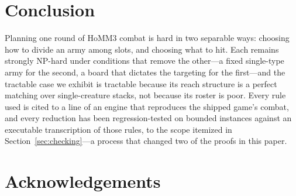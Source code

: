 \documentclass[11pt,a4paper]{article}
\theoremstyle{plain}
\theoremstyle{definition}
\theoremstyle{plain}
\theoremstyle{definition}
\theoremstyle{remark}
\begin{document}
\section{Conclusion}\label{sec:conclusion}

Planning one round of HoMM3 combat is hard in two separable ways: choosing how to divide an army
among slots, and choosing what to hit. Each remains strongly NP-hard under conditions that remove
the other---a fixed single-type army for the second, a board that dictates the targeting for the
first---and the tractable case we exhibit is tractable because its reach structure is a perfect
matching over single-creature stacks, not because its roster is poor. Every rule used is cited to a line of an engine that
reproduces the shipped game's combat, and every reduction has been regression-tested on bounded
instances against an executable transcription of those rules, to the scope itemized in
Section~\ref{sec:checking}---a process that changed two of the proofs in this paper.

\section*{Acknowledgements}\label{sec:ack}
\end{document}
